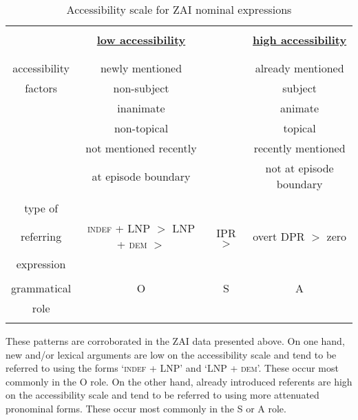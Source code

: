 \begin{table}[H]
\begin{center} 
\begin{tabular}{| c | c  c  c |}\hline
  
      & &  &   \\
       &   \textbf{\underline{low accessibility}}  &  &  \textbf{\underline{high accessibility}}  \\
 
  & &  & \\
 \hline
 & & & \\

accessibility &  newly mentioned  &   & already mentioned   \\
factors &  non-subject  &   & subject   \\
   &    inanimate  &  & animate  \\
   &     non-topical  &   & topical  \\
    &      not mentioned recently  &  & recently mentioned   \\
      &      at episode boundary  &   & not at episode boundary \\
      
       & &  &   \\
  \hline

type of  &  & &   \\  
referring & \textsc{indef}  + LNP $>$ LNP + \textsc{dem}  $>$ &    IPR  $>$ &  overt DPR $>$ zero \\
expression & &    &  \\

 \hline
 & &  & \\
  grammatical & O &  S & A \\
role & & &  \\
& & & \\
\hline

\end{tabular}\caption{\small{Accessibility scale for ZAI nominal expressions}}
\label{accessibilityscale}
\end{center}
\end{table}
 
These patterns are corroborated in the ZAI data presented above. On one hand, new and/or lexical arguments are low on the accessibility scale and tend to be referred to using the forms `\textsc{indef}  + LNP' and `LNP + \textsc{dem}'. These occur most commonly in the O role. On the other hand, already introduced referents are high on the accessibility scale and tend to be referred to using more attenuated pronominal forms. These occur most commonly in the S or A role. 

